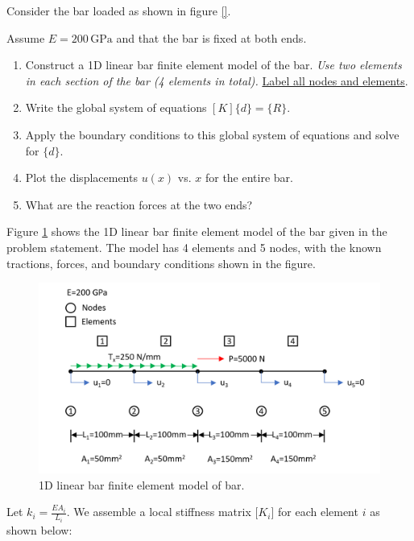 \documentclass[../main.tex]{subfiles}
\begin{document}

Consider the bar loaded as shown in figure \ref{}.

Assume \(E=200\,\unit{\giga\pascal}\) and that the bar is fixed at both ends.

\begin{enumerate}[label=\alph*)]
    \item Construct a 1D linear bar finite element model of the bar. \textit{Use two elements in each section of the bar (4 elements in total).} \underline{Label all nodes and elements}.
    \item Write the global system of equations \([K]\{d\} = \{R\}\).
    \item Apply the boundary conditions to this global system of equations and solve for \(\{d\}\).
    \item Plot the displacements \(u(x)\) vs. \(x\) for the entire bar.
    \item What are the reaction forces at the two ends?
\end{enumerate}


Figure \ref{fea_bar} shows the 1D linear bar finite element model of the bar given in the problem statement.
The model has 4 elements and 5 nodes, with the known tractions, forces, and boundary conditions shown in the figure.

\begin{figure}[h!]
    \centering
    \includegraphics[scale=0.45]{../../images/problem_5/5elementbar.png}
    \caption{1D linear bar finite element model of bar.}
    \label{fea_bar}
\end{figure}


Let \(k_i = \frac{EA_i}{L_i}\).
We assemble a local stiffness matrix \([K_i\)] for each element \(i\) as shown below:
\end{document}
